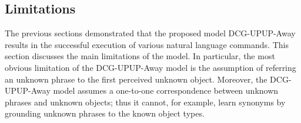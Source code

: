 \subsection{Limitations}
The previous sections demonstrated that the proposed model DCG-UPUP-Away results in the successful execution of various natural language commands. This section discusses the main limitations of the model.
In particular, the most obvious limitation of the DCG-UPUP-Away model is the assumption of referring an unknown phrase to the first perceived unknown object. %
Moreover, the DCG-UPUP-Away model assumes a one-to-one correspondence between unknown phrases and unknown objects; thus it cannot, for example, learn synonyms by grounding unknown phrases to the known object types.